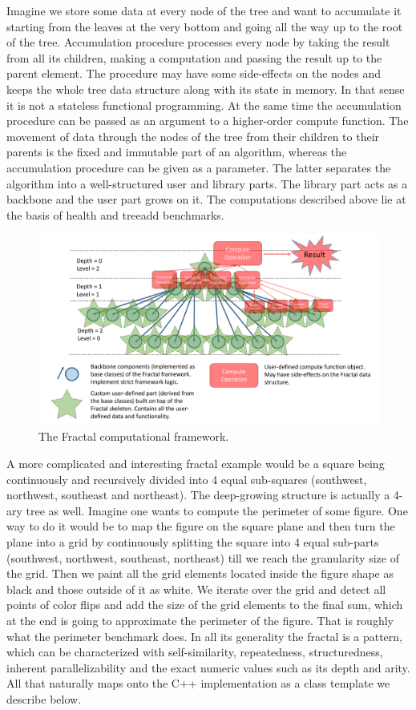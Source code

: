 Imagine we store some data at every node of the tree and want to accumulate it starting from the leaves at the very bottom and going all the way up to the root of the tree. Accumulation procedure processes every node by taking the result from all its children, making a computation and passing the result up to the parent element. The procedure may have some side-effects on the nodes and keeps the whole tree data structure along with its state in memory. In that sense it is not a stateless functional programming. At the same time the accumulation procedure can be passed as an argument to a higher-order compute function. The movement of data through the nodes of the tree from their children to their parents is the fixed and immutable part of an algorithm, whereas the accumulation procedure can be given as a parameter. The latter separates the algorithm into a well-structured user and library parts. The library part acts as a backbone and the user part grows on it. The computations described above lie at the basis of health and treeadd benchmarks.\newline\null
\begin{figure}[ht]
\includegraphics[width=1.0\textwidth]{images/Fractal.pdf}
\caption{The Fractal computational framework.}
\label{fig:fractal}
\end{figure}
\quad A more complicated and interesting fractal example would be a square being continuously and recursively divided into 4 equal sub-squares (southwest, northwest, southeast and northeast). The deep-growing structure is actually a 4-ary tree as well. Imagine one wants to compute the perimeter of some figure. One way to do it would be to map the figure on the square plane and then turn the plane into a grid by continuously splitting the square into 4 equal sub-parts (southwest, northwest, southeast, northeast) till we reach the granularity size of the grid. Then we paint all the grid elements located inside the figure shape as black and those outside of it as white. We iterate over the grid and detect all points of color flips and add the size of the grid elements to the final sum, which at the end is going to approximate the perimeter of the figure. That is roughly what the perimeter benchmark does.\newline\null
\quad In all its generality the fractal is a pattern, which can be characterized with self-similarity, repeatedness, structuredness, inherent parallelizability and the exact numeric values such as its depth and arity. All that naturally maps onto the C++ implementation as a class template we describe below.


